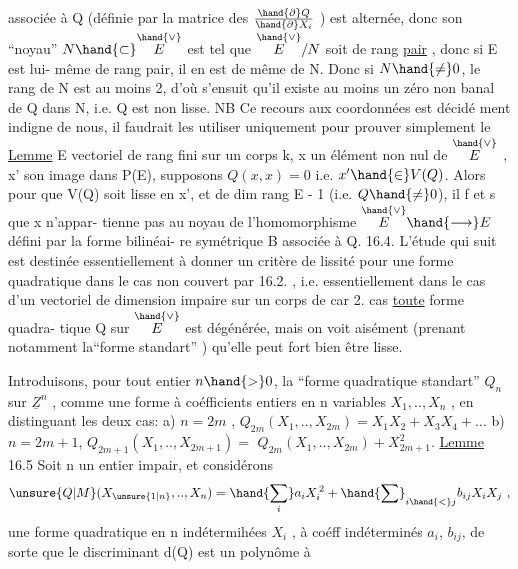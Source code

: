 
associée à Q (définie par la matrice des $\frac{\hand{\partial} Q}{\hand{\partial} X_i}$ ) est alternée, donc son
``noyau''  $N\hand{\subset}\overset{\hand{\vee}}{E}$  est tel que  $\overset{\hand{\vee}}{E}/N$  soit de rang \uline{pair} , donc si E est lui-%
même de rang pair, il en est de même de N. Donc si $N\hand{\neq} 0$, le rang de N
est au moins 2, d'où s'ensuit qu'il existe au moins un zéro non banal de
Q dans N, i.e. Q est non lisse.  NB Ce recours aux coordonnées est décidé
ment indigne de nous, il faudrait les utiliser uniquement pour prouver
simplement le
\uline{Lemme}  E vectoriel de rang fini sur un corps k,  x un élément non nul de
$\overset{\hand{\vee}}{E}$ ,  x' son image dans P(E), supposons  $Q(x,x) = 0$ i.e.
$x'\hand{\in} V(Q)$. Alors pour que  V(Q) soit lisse en x',
et de dim  rang E - 1   (i.e. $Q\hand{\neq} 0$), il f et s  que x n'appar-%
tienne pas au noyau de l'homomorphisme $\overset{\hand{\vee}}{E}\hand{\longrightarrow} E$ défini par la forme bilinéai-%
re symétrique B associée à Q\hand{/}.
16.4.  L'étude qui suit est destinée essentiellement à 
donner un critère de lissité pour une forme quadratique dans le cas non
couvert par 16.2. , i.e. essentiellement dans le cas d'un vectoriel de
dimension impaire sur un corps de car 2.  cas \uline{toute} forme quadra-%
tique  Q  sur $\overset{\hand{\vee}}{E}$ est dégénérée, mais on voit aisément (prenant notamment
la``forme standart'' ) qu'elle peut fort bien être lisse.

Introduisons, pour tout entier  $n\hand{>}0$, la ``forme quadratique standart''
$Q_n$ sur $\underline{Z}^n$ , comme une forme à coéfficients entiers en n variables
$X_1,..,X_n$ ,  en distinguant les deux cas:
a)  $n = 2m$  ,  $Q_{2m}(X_1,..,X_{2m}) = X_1X_2 + X_3X_4 + \ldots$
b)  $n = 2m+1$,  $Q_{2m+1}(X_1,..,X_{2m+1}) =$ $Q_{2m}(X_1,..,X_{2m}) + X_{2m+1}^2$.
\uline{Lemme} 16.5  Soit n un entier impair, et considérons
\[ \unsure{Q|M}(X_{\unsure{1|n}},..,X_n) = \hand{\sum_i} a_iX_i^{\,2} + \hand{\sum}_{i\hand{<}j} b_{ij}X_iX_j \ , \]
une forme quadratique en n indétermihées $X_i$ , à coéff indéterminés
$a_i$, $b_{ij}$, de sorte que le discriminant  d(Q)  est un polynôme à

